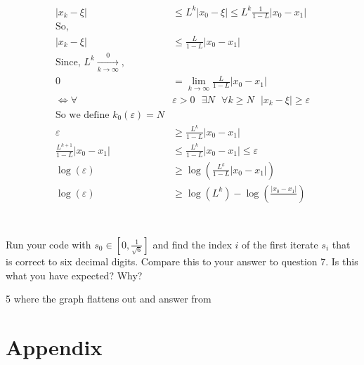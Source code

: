 \documentclass{article}
\begin{document}
\begin{align*}
    |x_k-\xi| &\le L^k|x_0-\xi|\le L^k \frac{1}{1-L}|x_0-x_1|\\
    \text{So,}&\\
    |x_k-\xi|& \le \frac{L}{1-L}|x_0-x_1|\\
    \text{Since, $L^k \xrightarrow[k \to \infty]0$,}\\
    0 &=\lim_{k \to \infty}\frac{L}{1-L}|x_0-x_1|\\
    \Longleftrightarrow \forall& \varepsilon>0 \text{ }\exists N\text{ } \forall k \ge N \text{ }|x_k-\xi|\ge \varepsilon\\
    \text{So we define $k_0(\varepsilon)=N$}&\\
    \varepsilon &\ge \frac{L^k}{1-L}|x_0-x_1|\\
    \frac{L^{k+1}}{1-L}|x_0-x_1|&\le \frac{L^k}{1-L}|x_0-x_1| \le \varepsilon\\
    \log(\varepsilon) &\ge \log\left(\frac{L^k}{1-L}|x_0-x_1|  \right)\\
    \log(\varepsilon) &\ge \log(L^k)-\log \left(\frac{|x_0-x_1|}{}  \right)\\
\end{align*}


\section{}
Run your code with $s_0 \in \left[0,\frac{1}{\sqrt{6}} \right]$ and find the index $i$ of the first iterate $s_i$ that is correct to six decimal digits. Compare this to your answer to question 7. Is this what you have expected? Why?
\vspace{10mm}

5 where the graph flattens out and answer from

\section*{Appendix}
\end{document}
